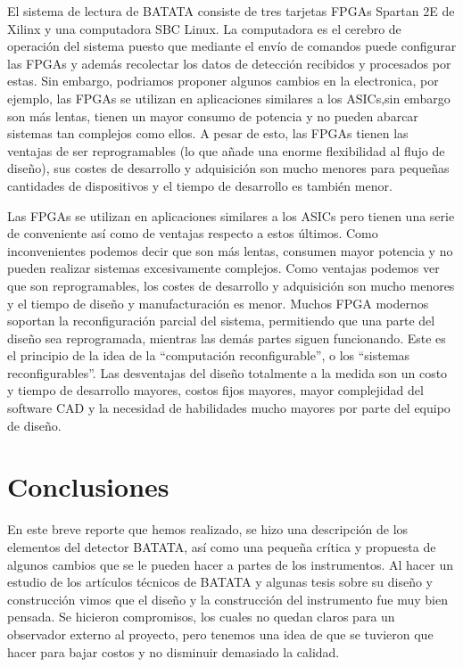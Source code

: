 \documentclass[a4paper,10pt]{article}
\numberwithin{equation}{section}
\begin{document}
El sistema de lectura de BATATA consiste de tres tarjetas FPGAs Spartan 2E de 
Xilinx y una computadora SBC Linux. La computadora es el cerebro de operación del
sistema puesto que mediante el envío de comandos puede configurar las FPGAs y 
además recolectar los datos de detección recibidos y procesados por estas.  
Sin embargo, podriamos proponer algunos cambios en la electronica, por ejemplo,
las FPGAs se utilizan en aplicaciones similares a los ASICs,sin embargo son más 
lentas, tienen un mayor consumo de potencia y no pueden abarcar sistemas tan
complejos como ellos. A pesar de esto, las FPGAs tienen las ventajas de ser
reprogramables (lo que añade una enorme flexibilidad al flujo de diseño),
sus costes de desarrollo y adquisición son mucho menores para pequeñas cantidades 
de dispositivos y el tiempo de desarrollo es también menor.

\vspace{.3cm}

Las FPGAs se utilizan en aplicaciones similares a los ASICs pero tienen una serie 
de conveniente así como de ventajas respecto a estos últimos. Como inconvenientes podemos 
decir que son más lentas, consumen mayor potencia y no pueden realizar sistemas excesivamente 
complejos. Como ventajas podemos ver que son reprogramables, los costes de desarrollo 
y adquisición son mucho menores y el tiempo de diseño y manufacturación es menor.
Muchos FPGA modernos soportan la reconfiguración parcial del sistema, 
permitiendo que una parte del diseño sea reprogramada, mientras las demás partes 
siguen funcionando. Este es el principio de la idea de la ``computación 
reconfigurable'', o los ``sistemas reconfigurables''. Las desventajas del diseño 
totalmente a la medida son un costo y tiempo de desarrollo mayores, costos fijos 
mayores, mayor complejidad del software CAD y la necesidad de habilidades mucho 
mayores por parte del equipo de diseño.

\newpage

\section*{Conclusiones}

En este breve reporte que hemos realizado, se hizo una descripción de los 
elementos del detector BATATA, así como una pequeña crítica y propuesta de algunos 
cambios que se le pueden hacer a partes de los instrumentos. Al hacer un estudio 
de los artículos técnicos de BATATA y algunas tesis sobre su diseño y construcción 
vimos que el diseño y la construcción del instrumento fue muy bien pensada. Se 
hicieron compromisos, los cuales no quedan claros para un observador externo al 
proyecto, pero tenemos una idea de que se tuvieron que hacer para bajar costos y 
no disminuir demasiado la calidad. 
\end{document}
